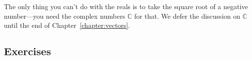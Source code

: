 		The only thing you can't do with the reals is to take the square root of a negative number---you 							
		need the complex numbers $\mathbb{C}$ for that.
		We defer the discussion on $\mathbb{C}$ until the end of Chapter~\ref{chapter:vectors}.


	\subsection{Exercises}
	\label{numbers:exercises}
	
		
	

